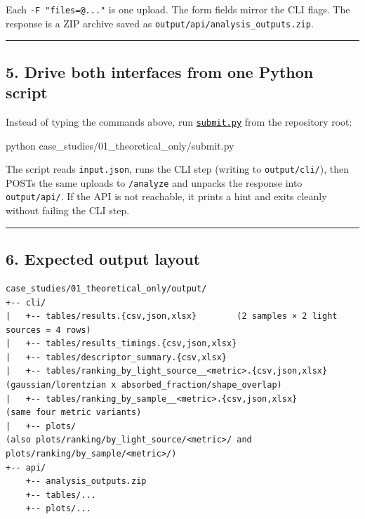 \documentclass[
  11pt,
]{article}
\newenvironment{Shaded}{}{}
\newcommand{\ExtensionTok}[1]{#1}
\newcommand{\NormalTok}[1]{#1}
\begin{document}
Each \texttt{-F\ "files=@..."} is one upload. The form fields mirror the
CLI flags. The response is a ZIP archive saved as
\texttt{output/api/analysis\_outputs.zip}.

\begin{center}\rule{0.5\linewidth}{0.5pt}\end{center}

\hypertarget{5-drive-both-interfaces-from-one-python-script}{
\subsection{5. Drive both interfaces from one Python
script}\label{5-drive-both-interfaces-from-one-python-script}}

Instead of typing the commands above, run
\href{https://github.com/pinarsyt/overlap-calculator/blob/main/case_studies/01_theoretical_only/submit.py}{\texttt{submit.py}}
from the repository root:

\begin{Shaded}
\begin{Highlighting}[]
\ExtensionTok{python}\NormalTok{ case\_studies/01\_theoretical\_only/submit.py}
\end{Highlighting}
\end{Shaded}

The script reads \texttt{input.json}, runs the CLI step (writing to
\texttt{output/cli/}), then POSTs the same uploads to \texttt{/analyze}
and unpacks the response into \texttt{output/api/}. If the API is not
reachable, it prints a hint and exits cleanly without failing the CLI
step.

\begin{center}\rule{0.5\linewidth}{0.5pt}\end{center}

\hypertarget{6-expected-output-layout}{
\subsection{6. Expected output layout}\label{6-expected-output-layout}}

\begin{verbatim}
case_studies/01_theoretical_only/output/
+-- cli/
|   +-- tables/results.{csv,json,xlsx}        (2 samples × 2 light sources = 4 rows)
|   +-- tables/results_timings.{csv,json,xlsx}
|   +-- tables/descriptor_summary.{csv,xlsx}
|   +-- tables/ranking_by_light_source__<metric>.{csv,json,xlsx}   (gaussian/lorentzian x absorbed_fraction/shape_overlap)
|   +-- tables/ranking_by_sample__<metric>.{csv,json,xlsx}          (same four metric variants)
|   +-- plots/                                                      (also plots/ranking/by_light_source/<metric>/ and plots/ranking/by_sample/<metric>/)
+-- api/
    +-- analysis_outputs.zip
    +-- tables/...
    +-- plots/...
\end{verbatim}
\end{document}
